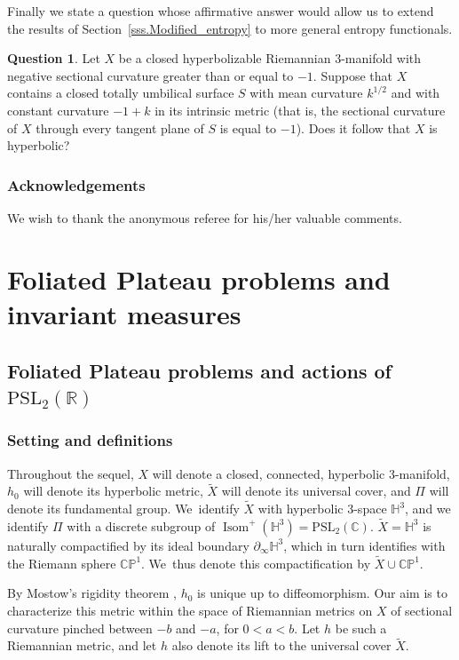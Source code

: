 \documentclass[10pt]{amsart}
\theoremstyle{plain}
\theoremstyle{definition}
\newtheorem{question}[theorem]{Question}
\newcommand\PSL{\mathrm{PSL}_2(\mathbb{R})}
\newcommand\PSLc{\mathrm{PSL}_2(\mathbb{C})}
\newcommand\Hyp{\mathbb{H}^3}
\newcommand\CP{\C\PP^1}
\newcommand{\C}{{\mathbb C}}
\newcommand{\PP}{{\mathbb P}}
\newcommand{\bord}{\partial_{\infty}}
\DeclareMathOperator{\Isom}{Isom}
\let\Subsection\subsection\let\Subsubsection\subsubsection
\begin{document}
Finally we state a question whose affirmative answer would allow us to extend the results of Section~\ref{sss.Modified_entropy} to more general entropy functionals.

\begin{question} \label{question:intro}
Let $X$ be a closed hyperbolizable Riemannian 3-manifold with negative sectional curvature greater than or equal to $-1$. Suppose that $X$ contains a closed totally umbilical surface $S$ with mean curvature $k^{1/2}$ and with constant curvature $-1+k$ in its intrinsic metric (that is, the sectional curvature of $X$ through every tangent plane of $S$ is equal to $-1$). Does it follow that $X$ is hyperbolic?
\end{question}

\subsubsection*{Acknowledgements}
We wish to thank the anonymous referee for his/her valuable comments.

\section{Foliated Plateau problems and invariant measures}

\Subsection{Foliated Plateau problems and actions of $\PSL$}\label{ss.as_Plateau}

\subsubsection{Setting and definitions}\label{ss.as_Plateau_definitions} Throughout the sequel, $X$ will denote a closed, connected, hyperbolic $3$\nobreakdash-manifold, $h_0$ will denote its hyperbolic metric, $\tilde{X}$ will denote its universal cover, and $\Pi$ will denote its fundamental group. We~identify $\tilde{X}$ with hyperbolic $3$\nobreakdash-space $\Hyp$, and we identify $\Pi$ with a discrete subgroup of $\Isom^+(\Hyp)=\PSLc$. $\tilde{X}=\Hyp$ is naturally compactified by its ideal boundary $\bord\Hyp$, which in turn identifies with the Riemann sphere $\CP$. We~thus denote this compactification by $\tilde{X}\cup\CP$.

By Mostow's rigidity theorem \cite{Mostow}, $h_0$ is unique up to diffeomorphism. Our aim is to characterize this metric within the space of Riemannian metrics on $X$ of sectional curvature pinched between $-b$ and $-a$, for $0<a<b$. Let $h$ be such a Riemannian metric, and let $h$ also denote its lift to the universal cover $\tilde{X}$.
\end{document}
